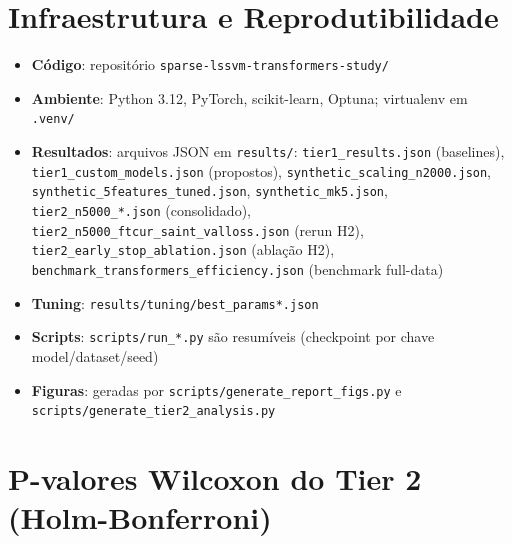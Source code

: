 \documentclass[12pt,a4paper]{article}
\begin{document}
\appendix
\section{Infraestrutura e Reprodutibilidade}

\begin{itemize}\sloppy
  \item \textbf{Código}: repositório \texttt{sparse-lssvm-transformers-study/}
  \item \textbf{Ambiente}: Python 3.12, PyTorch, scikit-learn, Optuna;
        virtualenv em \texttt{.venv/}
  \item \textbf{Resultados}: arquivos JSON em \texttt{results/}:
        \texttt{tier1\_results.json} (baselines),
        \texttt{tier1\_custom\_models.json} (propostos),
        \texttt{synthetic\_scaling\_n2000.json},
        \texttt{synthetic\_5features\_tuned.json},
        \texttt{synthetic\_mk5.json},
        \texttt{tier2\_n5000\_*.json} (consolidado),
        \texttt{tier2\_n5000\_ftcur\_saint\_valloss.json} (rerun H2),
        \texttt{tier2\_early\_stop\_ablation.json} (ablação H2),
        \texttt{benchmark\_transformers\_efficiency.json}
        (benchmark full-data)
  \item \textbf{Tuning}: \texttt{results/tuning/best\_params*.json}
  \item \textbf{Scripts}: \texttt{scripts/run\_*.py} são resumíveis
        (checkpoint por chave model/dataset/seed)
  \item \textbf{Figuras}: geradas por \texttt{scripts/generate\_report\_figs.py}
        e \texttt{scripts/generate\_tier2\_analysis.py}
\end{itemize}

\section{P-valores Wilcoxon do Tier 2 (Holm-Bonferroni)}


\end{document}
